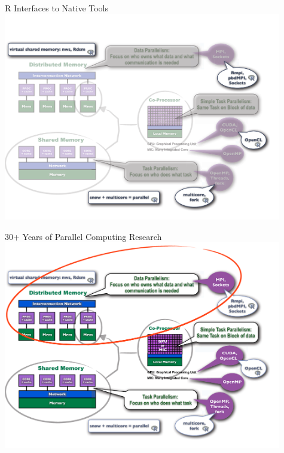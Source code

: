 \begin{frame}
\begin{block}{R Interfaces to Native Tools}
    \includegraphics[width=0.91\textwidth]{pics/ParallelHardware7.pdf}
\end{block}
\end{frame}

\begin{frame}
\begin{block}{30+ Years of Parallel Computing Research}
    \includegraphics[width=0.91\textwidth]{pics/ParallelHardware8.pdf}
\end{block}
\end{frame}

